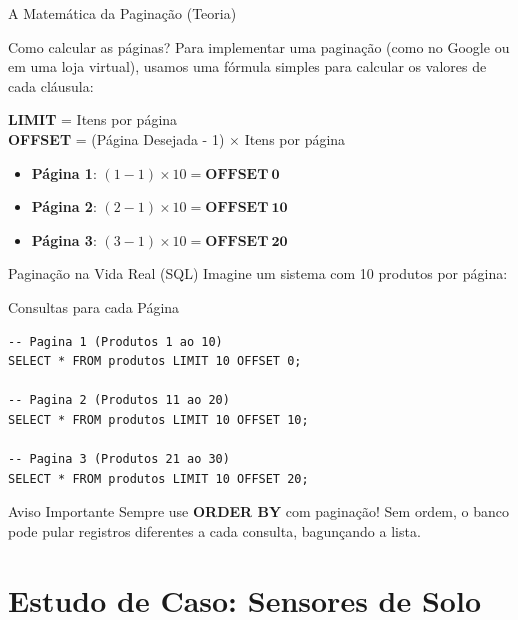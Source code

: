 \documentclass[9pt]{beamer}
\begin{document}
\begin{frame}{A Matemática da Paginação (Teoria)}
  \begin{block}{Como calcular as páginas?}
    Para implementar uma paginação (como no Google ou em uma loja virtual), usamos uma fórmula simples para calcular os valores de cada cláusula:
  \end{block}
  \vspace{0.4cm}
  \centering
  \large
  \textbf{LIMIT} = Itens por página \\
  \textbf{OFFSET} = (Página Desejada - 1) $\times$ Itens por página
  
  \vspace{0.6cm}
  \small
  \begin{itemize}
    \item \textbf{Página 1}: $(1-1) \times 10 = \mathbf{OFFSET\ 0}$
    \item \textbf{Página 2}: $(2-1) \times 10 = \mathbf{OFFSET\ 10}$
    \item \textbf{Página 3}: $(3-1) \times 10 = \mathbf{OFFSET\ 20}$
  \end{itemize}
\end{frame}

\begin{frame}[fragile]{Paginação na Vida Real (SQL)}
  \small
  Imagine um sistema com 10 produtos por página:
  \vspace{0.3cm}
  \begin{exampleblock}{Consultas para cada Página}
\begin{lstlisting}
-- Pagina 1 (Produtos 1 ao 10)
SELECT * FROM produtos LIMIT 10 OFFSET 0;

-- Pagina 2 (Produtos 11 ao 20)
SELECT * FROM produtos LIMIT 10 OFFSET 10;

-- Pagina 3 (Produtos 21 ao 30)
SELECT * FROM produtos LIMIT 10 OFFSET 20;
\end{lstlisting}
  \end{exampleblock}
  \vspace{0.2cm}
  \begin{alertblock}{Aviso Importante}
    Sempre use \textbf{ORDER BY} com paginação! Sem ordem, o banco pode pular registros diferentes a cada consulta, bagunçando a lista.
  \end{alertblock}
\end{frame}

\section{Estudo de Caso: Sensores de Solo}
\end{document}
